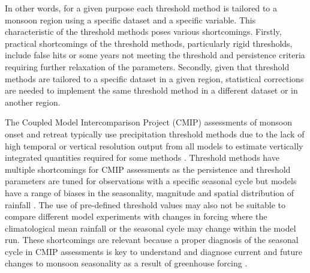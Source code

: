 

In other words, for a given purpose each threshold method is tailored to a monsoon region using a specific dataset and a specific variable. This characteristic of the threshold methods poses various shortcomings.  
 Firstly, practical shortcomings of the threshold methods, particularly rigid thresholds, include false hits \citep{moron2014interannual} or some years not meeting the threshold and persistence criteria \citep{arias2012} requiring further relaxation of the parameters. Secondly, given that threshold methods are tailored to a specific dataset in a given region, statistical corrections are needed to implement the same threshold method in a different dataset or in another region. 
 
 The Coupled Model Intercomparison Project (CMIP) assessments of monsoon onset and retreat typically use precipitation threshold methods due to the lack of high temporal or vertical resolution output from all models to estimate vertically integrated quantities required for some methods \citep[e.g.][]{geil2013,zou2015,jamoon2020}. Threshold methods have multiple shortcomings for CMIP assessments as the persistence and threshold parameters are tuned for observations with a specific seasonal cycle but models have a range of biases in the seasonality, magnitude and spatial distribution of rainfall \citep{pascale2019,garciafranco2020}. 
The use of pre-defined threshold values may also not be suitable to compare different model experiments with changes in forcing where the climatological mean rainfall or the seasonal cycle may change within the model run.
These shortcomings are relevant because a proper diagnosis of the seasonal cycle in CMIP assessments is key to understand and diagnose current and future changes to monsoon seasonality as a result of greenhouse forcing \citep{zhou2016,wang2017}. 

